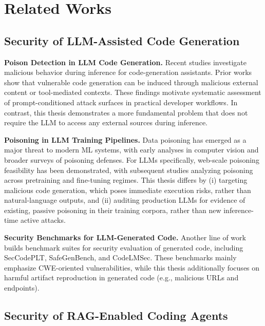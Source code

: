 


\section{Related Works}


\subsection{Security of LLM-Assisted Code Generation}

\noindent \textbf{Poison Detection in LLM Code Generation.}
Recent studies investigate malicious behavior during inference 
for code-generation assistants.
Prior works\cite{zeng2025inducing,yi2025benchmarking} show that vulnerable code generation can 
be induced through malicious external content or tool-mediated 
contexts.
These findings motivate systematic assessment of prompt-conditioned 
attack surfaces in practical developer workflows.
In contrast, this thesis demonstrates a more fundamental 
problem that does not require the LLM to 
access any external sources during inference. 


\noindent \textbf{Poisoning in LLM Training Pipelines.}
Data poisoning has emerged as a major threat to modern ML systems, 
with early analyses in computer vision and broader surveys of poisoning 
defenses\cite{cina2023wild,raghavan2022improved,goldblum2022dataset}.
For LLMs specifically, web-scale poisoning feasibility has been 
demonstrated\cite{carlini2024poisoning},
with subsequent studies analyzing poisoning across pretraining and 
fine-tuning regimes\cite{zhao2025data,jiang2024turning}.
This thesis differs by (i) targeting malicious code 
generation, which poses immediate execution risks, rather 
than natural-language outputs, and (ii) auditing production 
LLMs for evidence of existing, passive poisoning in 
their training corpora, rather than new inference-time active attacks.



\noindent \textbf{Security Benchmarks for LLM-Generated Code.}
Another line of work builds benchmark suites for security 
evaluation of generated code,
including SecCodePLT, SafeGenBench, and 
CodeLMSec\cite{yang2024seccodeplt,li2025safegenbench,debenedetti2023a}.
These benchmarks mainly emphasize CWE-oriented vulnerabilities,
while this thesis additionally focuses on harmful 
artifact reproduction in generated code (e.g., malicious URLs and endpoints).


\subsection{Security of RAG-Enabled Coding Agents}

